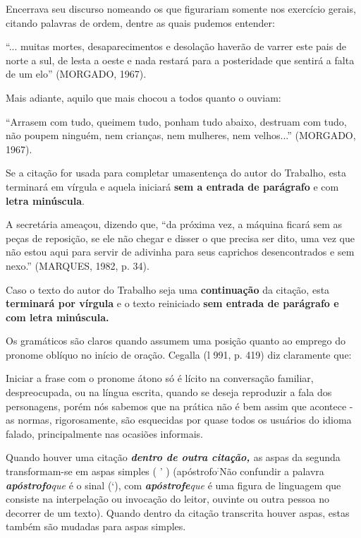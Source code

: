 \documentclass[rel_mlp]{iiufrgs}
\newenvironment{citacao}{
    \small
    \begin{list}{}{
        \setlength{\leftmargin}{4.0cm}
        \setstretch{1}
        \setlength{\topsep}{1.2cm}
        \setlength{\listparindent}{\parindent}
    }
    \item[]}{\end{list}
}
\begin{document}
Encerrava seu discurso nomeando os que figurariam somente nos exercício gerais, citando palavras de ordem, dentre as quais pudemos entender:

``... muitas mortes, desaparecimentos e desolação haverão de varrer este pais de norte a sul, de lesta a oeste e nada restará para a posteridade que sentirá a falta de um elo'' (MORGADO, 1967).

Mais adiante, aquilo que mais chocou a todos quanto o ouviam:

``Arrasem com tudo, queimem tudo, ponham tudo abaixo, destruam com tudo, não poupem ninguém, nem crianças, nem mulheres, nem velhos...'' (MORGADO, 1967).

Se a citação for usada para completar uma{\bf  }sentença do autor do Trabalho, esta terminará em vírgula e aquela iniciará {\bf sem a entrada de parágrafo} e com {\bf letra minúscula}. 

A secretária ameaçou, dizendo que, ``da próxima vez, a máquina ficará sem as peças de reposição, se ele não chegar e disser o que precisa ser dito, uma vez que não estou aqui para servir de adivinha para seus caprichos desencontrados e sem nexo.'' (MARQUES, 1982, p. 34).

Caso o texto do autor do Trabalho seja uma {\bf continuação }da citação, esta {\bf terminará por vírgula }e o texto reiniciado {\bf sem entrada de parágrafo e com letra minúscula.}

 Os gramáticos são claros quando assumem uma posição quanto ao emprego do pronome oblíquo no início de oração. Cegalla (l 991, p. 419) diz claramente que:

\begin{citacao}
 Iniciar a frase com o pronome átono só é lícito na conversação familiar, despreocupada, ou na língua escrita, quando se deseja reproduzir a fala dos personagens, porém nós sabemos que na prática não é bem assim que acontece - as normas, rigorosamente, são esquecidas por quase todos os usuários do idioma falado, principalmente nas ocasiões informais.
\end{citacao}

Quando houver uma citação {\bf {\it dentro de outra citação, }}as aspas da segunda transformam-se em aspas simples ( ' ) (apóstrofo${}^{: }$Não confundir a palavra {\bf {\it apóstrofo}}{\it  que }é o sinal (`), com {\bf {\it apóstrofe}}{\it  que }é uma figura de linguagem que consiste na interpelação ou invocação do leitor, ouvinte ou outra pessoa no decorrer de um texto). Quando dentro da citação transcrita houver aspas, estas também são mudadas para aspas simples.
\end{document}
